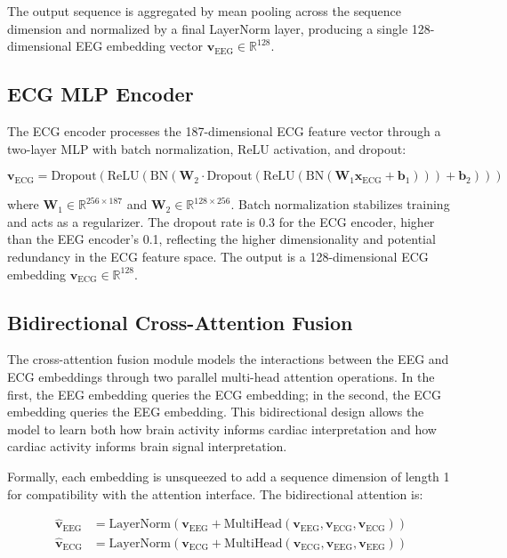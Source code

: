 \documentclass[12pt,letterpaper]{report}
\begin{document}
The output sequence is aggregated by mean pooling across the sequence dimension and normalized by a final LayerNorm layer, producing a single 128-dimensional EEG embedding vector $\mathbf{v}_{\text{EEG}} \in \mathbb{R}^{128}$.

\subsection{ECG MLP Encoder}
\label{subsec:ecg_encoder}

The ECG encoder processes the 187-dimensional ECG feature vector through a two-layer MLP with batch normalization, ReLU activation, and dropout:

\begin{equation}
\label{eq:ecg_enc}
\mathbf{v}_{\text{ECG}} = \text{Dropout}\left(\text{ReLU}\left(\text{BN}\left(\mathbf{W}_2 \cdot \text{Dropout}\left(\text{ReLU}\left(\text{BN}\left(\mathbf{W}_1 \mathbf{x}_{\text{ECG}} + \mathbf{b}_1\right)\right)\right) + \mathbf{b}_2\right)\right)\right)
\end{equation}

\noindent where $\mathbf{W}_1 \in \mathbb{R}^{256 \times 187}$ and $\mathbf{W}_2 \in \mathbb{R}^{128 \times 256}$. Batch normalization stabilizes training and acts as a regularizer. The dropout rate is 0.3 for the ECG encoder, higher than the EEG encoder's 0.1, reflecting the higher dimensionality and potential redundancy in the ECG feature space. The output is a 128-dimensional ECG embedding $\mathbf{v}_{\text{ECG}} \in \mathbb{R}^{128}$.

\subsection{Bidirectional Cross-Attention Fusion}
\label{subsec:fusion}

The cross-attention fusion module models the interactions between the EEG and ECG embeddings through two parallel multi-head attention operations. In the first, the EEG embedding queries the ECG embedding; in the second, the ECG embedding queries the EEG embedding. This bidirectional design allows the model to learn both how brain activity informs cardiac interpretation and how cardiac activity informs brain signal interpretation.

Formally, each embedding is unsqueezed to add a sequence dimension of length 1 for compatibility with the attention interface. The bidirectional attention is:

\begin{align}
\label{eq:eeg_to_ecg}
\hat{\mathbf{v}}_{\text{EEG}} &= \text{LayerNorm}\left(\mathbf{v}_{\text{EEG}} + \text{MultiHead}(\mathbf{v}_{\text{EEG}}, \mathbf{v}_{\text{ECG}}, \mathbf{v}_{\text{ECG}})\right) \\
\label{eq:ecg_to_eeg}
\hat{\mathbf{v}}_{\text{ECG}} &= \text{LayerNorm}\left(\mathbf{v}_{\text{ECG}} + \text{MultiHead}(\mathbf{v}_{\text{ECG}}, \mathbf{v}_{\text{EEG}}, \mathbf{v}_{\text{EEG}})\right)
\end{align}
\end{document}

